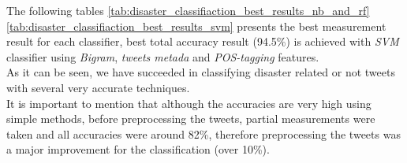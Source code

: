 \documentclass[letterpaper,twocolumn,10pt]{article}
\begin{document}
The following tables \ref{tab:disaster_classifiaction_best_results_nb_and_rf}  \ref{tab:disaster_classifiaction_best_results_svm} presents the best measurement result for each classifier, best total accuracy result (94.5\%) is achieved with \textit{SVM} classifier using \textit{Bigram}, \textit{tweets metada} and \textit{POS-tagging} features. \\
As it can be seen, we have succeeded in classifying disaster related or not tweets with several very accurate techniques. \\
It is important to mention that although the accuracies are very high using simple methods, before preprocessing the tweets, partial measurements were taken and all accuracies were around 82\%, therefore preprocessing the tweets was a major improvement for the classification (over 10\%).

\begin{table}[H]
	\caption{Disaster Classification Best Results: Naive Bayes and Random Forest}
	\label{tab:disaster_classifiaction_best_results_nb_and_rf}
	\begin{center}
	\end{center}
\end{table}

\begin{table}[H]
	\caption{Disaster Classification Best Results: SVM}
	\label{tab:disaster_classifiaction_best_results_svm}
	\begin{center}
	\end{center}
\end{table}
\end{document}
